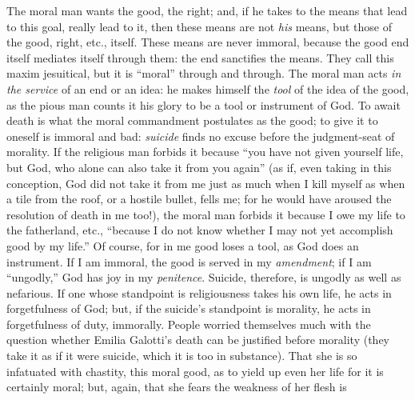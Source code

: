 \documentclass[12pt,a4paper]{book}
\begin{document}
The moral man wants the good, the right; and, if he takes to the means that 
lead to this goal, really lead to it, then these means are not \textit{his} 
means, but those of the good, right, etc., itself. These means are never 
immoral, because the good end itself mediates itself through them: the end 
sanctifies the means. They call this maxim jesuitical, but it is ``moral'' 
through and through. The moral man acts \textit{in the service} of an end or 
an idea: he makes himself the \textit{tool} of the idea of the good, as the 
pious man counts it his glory to be a tool or instrument of God. To await 
death is what the moral commandment postulates as the good; to give it to 
oneself is immoral and bad: \textit{suicide} finds no excuse before the 
judgment-seat of morality. If the religious man forbids it because ``you have 
not given yourself life, but God, who alone can also take it from you again'' 
(as if, even taking in this conception, God did not take it from me just as 
much when I kill myself as when a tile from the roof, or a hostile bullet, 
fells me; for he would have aroused the resolution of death in me too!), the 
moral man forbids it because I owe my life to the fatherland, etc., ``because 
I do not know whether I may not yet accomplish good by my life.'' Of course, 
for in me good loses a tool, as God does an instrument. If I am immoral, the 
good is served in my \textit{amendment}; if I am ``ungodly,'' God has joy in 
my \textit{penitence}. Suicide, therefore, is ungodly as well as nefarious. If 
one whose standpoint is religiousness takes his own life, he acts in 
forgetfulness of God; but, if the suicide's standpoint is morality, he acts in 
forgetfulness of duty, immorally. People worried themselves much with the 
question whether Emilia Galotti's death can be justified before morality (they 
take it as if it were suicide, which it is too in substance). That she is so 
infatuated with chastity, this moral good, as to yield up even her life for it 
is certainly moral; but, again, that she fears the weakness of her flesh is 
\end{document}
